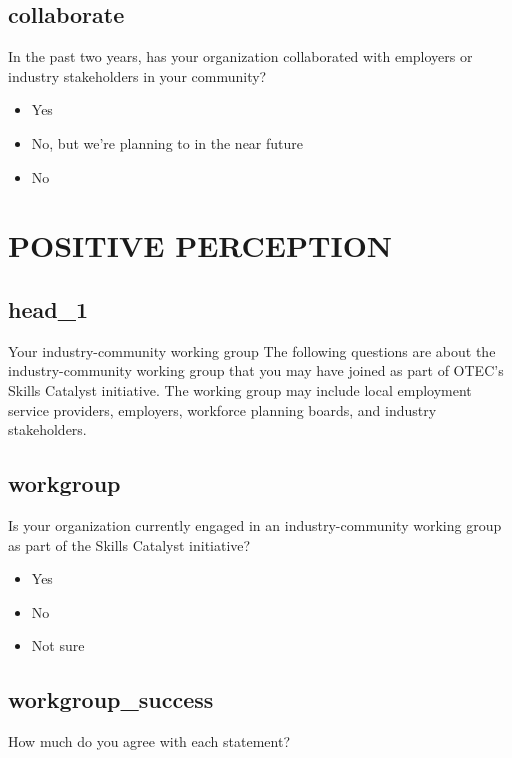 \documentclass[]{article}
\begin{document}
\subsection{collaborate}

In the past two years, has your organization collaborated with employers or industry stakeholders in your community?

\begin{itemize}
\item[\ding{109}] Yes
\item[\ding{109}] No, but we're planning to in the near future
\item[\ding{109}] No
\end{itemize}
\section{POSITIVE PERCEPTION}
\subsection{head_1}

Your industry-community working group   The following questions are about the industry-community working group that you may have joined as part of OTEC's Skills Catalyst initiative. The working group may include local employment service providers, employers, workforce planning boards, and industry stakeholders.





\subsection{workgroup}

Is your organization currently engaged in an industry-community working group as part of the Skills Catalyst initiative?

\begin{itemize}
\item[\ding{109}] Yes
\item[\ding{109}] No
\item[\ding{109}] Not sure
\end{itemize}




\subsection{workgroup_success}

How much do you agree with each statement?
\end{document}
